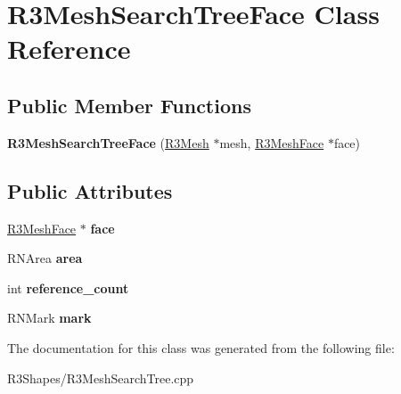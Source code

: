 \hypertarget{class_r3_mesh_search_tree_face}{}\section{R3\+Mesh\+Search\+Tree\+Face Class Reference}
\label{class_r3_mesh_search_tree_face}
\subsection*{Public Member Functions}
\begin{DoxyCompactItemize}
\item 
{\bfseries R3\+Mesh\+Search\+Tree\+Face} (\hyperlink{class_r3_mesh}{R3\+Mesh} $\ast$mesh, \hyperlink{class_r3_mesh_face}{R3\+Mesh\+Face} $\ast$face)\hypertarget{class_r3_mesh_search_tree_face_aa5226d0747188fc2246a4f80c986347f}{}\label{class_r3_mesh_search_tree_face_aa5226d0747188fc2246a4f80c986347f}

\end{DoxyCompactItemize}
\subsection*{Public Attributes}
\begin{DoxyCompactItemize}
\item 
\hyperlink{class_r3_mesh_face}{R3\+Mesh\+Face} $\ast$ {\bfseries face}\hypertarget{class_r3_mesh_search_tree_face_a3487a77a0f232be96c20e6c219e953e3}{}\label{class_r3_mesh_search_tree_face_a3487a77a0f232be96c20e6c219e953e3}

\item 
R\+N\+Area {\bfseries area}\hypertarget{class_r3_mesh_search_tree_face_a1f14c9b710466d9fb70df446cb5f4ec3}{}\label{class_r3_mesh_search_tree_face_a1f14c9b710466d9fb70df446cb5f4ec3}

\item 
int {\bfseries reference\+\_\+count}\hypertarget{class_r3_mesh_search_tree_face_a7b9e0384cd4fcc55ac50bedfb7bf3474}{}\label{class_r3_mesh_search_tree_face_a7b9e0384cd4fcc55ac50bedfb7bf3474}

\item 
R\+N\+Mark {\bfseries mark}\hypertarget{class_r3_mesh_search_tree_face_ad312b5ef3bf14aa37a8dce6a425fb9bf}{}\label{class_r3_mesh_search_tree_face_ad312b5ef3bf14aa37a8dce6a425fb9bf}

\end{DoxyCompactItemize}


The documentation for this class was generated from the following file\+:\begin{DoxyCompactItemize}
\item 
R3\+Shapes/R3\+Mesh\+Search\+Tree.\+cpp\end{DoxyCompactItemize}
